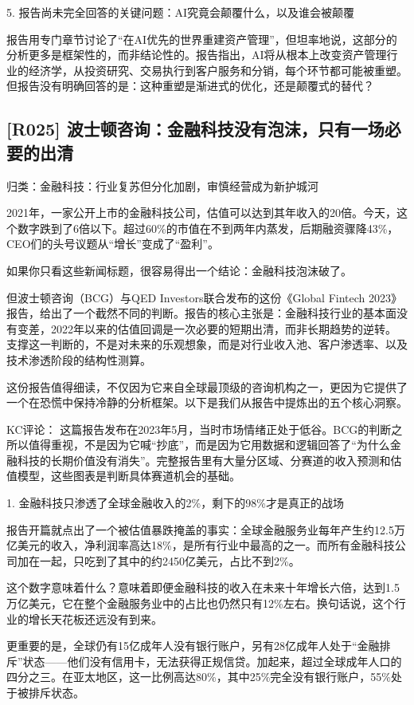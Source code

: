 \documentclass[11pt]{ctexart}
\begin{document}
5. 报告尚未完全回答的关键问题：AI究竟会颠覆什么，以及谁会被颠覆

报告用专门章节讨论了“在AI优先的世界重建资产管理”，但坦率地说，这部分的分析更多是框架性的，而非结论性的。报告指出，AI将从根本上改变资产管理行业的经济学，从投资研究、交易执行到客户服务和分销，每个环节都可能被重塑。但报告没有明确回答的是：这种重塑是渐进式的优化，还是颠覆式的替代？

\subsection{[R025] 波士顿咨询：金融科技没有泡沫，只有一场必要的出清}
{\small\color{refgray}归类：金融科技：行业复苏但分化加剧，审慎经营成为新护城河}

2021年，一家公开上市的金融科技公司，估值可以达到其年收入的20倍。今天，这个数字跌到了6倍以下。超过60\%的市值在不到两年内蒸发，后期融资骤降43\%，CEO们的头号议题从“增长”变成了“盈利”。

如果你只看这些新闻标题，很容易得出一个结论：金融科技泡沫破了。

但波士顿咨询（BCG）与QED Investors联合发布的这份《Global Fintech 2023》报告，给出了一个截然不同的判断。报告的核心主张是：金融科技行业的基本面没有变差，2022年以来的估值回调是一次必要的短期出清，而非长期趋势的逆转。 支撑这一判断的，不是对未来的乐观想象，而是对行业收入池、客户渗透率、以及技术渗透阶段的结构性测算。

这份报告值得细读，不仅因为它来自全球最顶级的咨询机构之一，更因为它提供了一个在恐慌中保持冷静的分析框架。以下是我们从报告中提炼出的五个核心洞察。

KC评论： 这篇报告发布在2023年5月，当时市场情绪正处于低谷。BCG的判断之所以值得重视，不是因为它喊“抄底”，而是因为它用数据和逻辑回答了“为什么金融科技的长期价值没有消失”。完整报告里有大量分区域、分赛道的收入预测和估值模型，这些图表是判断具体赛道机会的基础。

1. 金融科技只渗透了全球金融收入的2\%，剩下的98\%才是真正的战场

报告开篇就点出了一个被估值暴跌掩盖的事实：全球金融服务业每年产生约12.5万亿美元的收入，净利润率高达18\%，是所有行业中最高的之一。而所有金融科技公司加在一起，只吃到了其中的约2450亿美元，占比不到2\%。

这个数字意味着什么？意味着即便金融科技的收入在未来十年增长六倍，达到1.5万亿美元，它在整个金融服务业中的占比也仍然只有12\%左右。换句话说，这个行业的增长天花板还远没有到来。

更重要的是，全球仍有15亿成年人没有银行账户，另有28亿成年人处于“金融排斥”状态——他们没有信用卡，无法获得正规信贷。加起来，超过全球成年人口的四分之三。在亚太地区，这一比例高达80\%，其中25\%完全没有银行账户，55\%处于被排斥状态。
\end{document}
